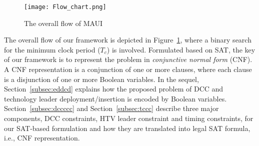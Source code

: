 \begin{figure}
	\centering
	\texttt{[image: Flow\_chart.png]}
	\caption{The overall flow of MAUI}
	\label{fig:flow}
\end{figure}
The overall flow of our framework is depicted in Figure~\ref{fig:flow}, where a binary search for the minimum clock period ($T_c$) is involved. Formulated based on SAT, the key of our framework is to represent the problem in \textit{conjunctive normal form} (CNF). A CNF representation is a conjunction of one or more clauses, where each clause is a disjunction of one or more Boolean variables. In the sequel, Section~\ref{subsec:eddcd} explains how the proposed problem of DCC and technology leader deployment/insertion is encoded by Boolean variables. Section~\ref{subsec:dccccc} and Section~\ref{subsec:tccc} describe three major components, DCC constraints, HTV leader constraint and timing constraints, for our SAT-based formulation and how they are translated into legal SAT formula, i.e., CNF representation.

